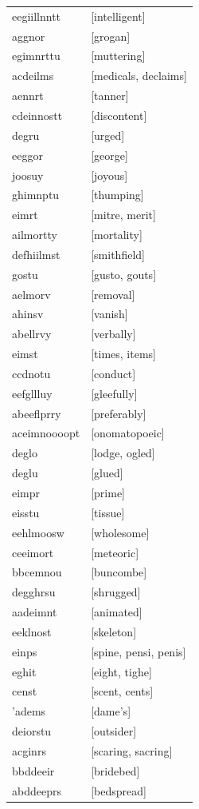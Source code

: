 \documentclass{article}
\begin{document}
\begin{tabular}{ll}
eegiillnntt & [intelligent] \\
aggnor & [grogan] \\
egimnrttu & [muttering] \\
acdeilms & [medicals, declaims] \\
aennrt & [tanner] \\
cdeinnostt & [discontent] \\
degru & [urged] \\
eeggor & [george] \\
joosuy & [joyous] \\
ghimnptu & [thumping] \\
eimrt & [mitre, merit] \\
ailmortty & [mortality] \\
defhiilmst & [smithfield] \\
gostu & [gusto, gouts] \\
aelmorv & [removal] \\
ahinsv & [vanish] \\
abellrvy & [verbally] \\
eimst & [times, items] \\
ccdnotu & [conduct] \\
eefgllluy & [gleefully] \\
abeeflprry & [preferably] \\
aceimnoooopt & [onomatopoeic] \\
deglo & [lodge, ogled] \\
deglu & [glued] \\
eimpr & [prime] \\
eisstu & [tissue] \\
eehlmoosw & [wholesome] \\
ceeimort & [meteoric] \\
bbcemnou & [buncombe] \\
degghrsu & [shrugged] \\
aadeimnt & [animated] \\
eeklnost & [skeleton] \\
einps & [spine, pensi, penis] \\
eghit & [eight, tighe] \\
censt & [scent, cents] \\
'adems & [dame's] \\
deiorstu & [outsider] \\
acginrs & [scaring, sacring] \\
bbddeeir & [bridebed] \\
abddeeprs & [bedspread] \\

\end{tabular}
\end{document}
